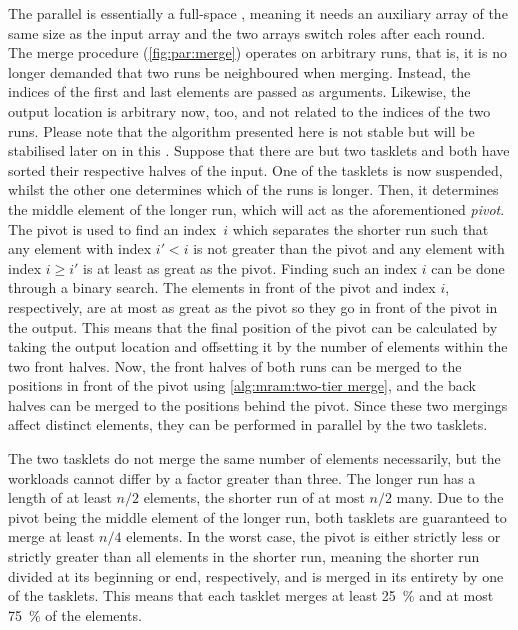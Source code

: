 The parallel \MS{} is essentially a full-space \MS{}, meaning it needs an auxiliary array of the same size as the input array and the two arrays switch roles after each round.
The merge procedure (\cref{fig:par:merge}) operates on arbitrary runs, that is, it is no longer demanded that two runs be neighboured when merging.
Instead, the indices of the first and last elements are passed as arguments.
Likewise, the output location is arbitrary now, too, and not related to the indices of the two runs.
Please note that the algorithm presented here is not stable but will be stabilised later on in this .
Suppose that there are but two tasklets and both have sorted their respective halves of the input.
One of the tasklets is now suspended, whilst the other one determines which of the runs is longer.
Then, it determines the middle element of the longer run, which will act as the aforementioned \emph{pivot}.
The pivot is used to find an index~\(i\) which separates the shorter run such that any element with index \(i' < i\) is not greater than the pivot and any element with index \(i \ge i'\) is at least as great as the pivot.
Finding such an index \(i\) can be done through a binary search.
The elements in front of the pivot and index \(i\), respectively, are at most as great as the pivot so they go in front of the pivot in the output.
This means that the final position of the pivot can be calculated by taking the output location and offsetting it by the number of elements within the two front halves.
Now, the front halves of both runs can be merged to the positions in front of the pivot using \cref{alg:mram:two-tier merge}, and the back halves can be merged to the positions behind the pivot.
Since these two mergings affect distinct elements, they can be performed in parallel by the two tasklets.

The two tasklets do not merge the same number of elements necessarily, but the workloads cannot differ by a factor greater than three.
The longer run has a length of at least \(n/2\) elements, the shorter run of at most \(n/2\) many.
Due to the pivot being the middle element of the longer run, both tasklets are guaranteed to merge at least \(n/4\) elements.
In the worst case, the pivot is either strictly less or strictly greater than all elements in the shorter run, meaning the shorter run divided at its beginning or end, respectively, and is merged in its entirety by one of the tasklets.
This means that each tasklet merges at least \qty{25}{\percent} and at most \qty{75}{\percent} of the elements.

